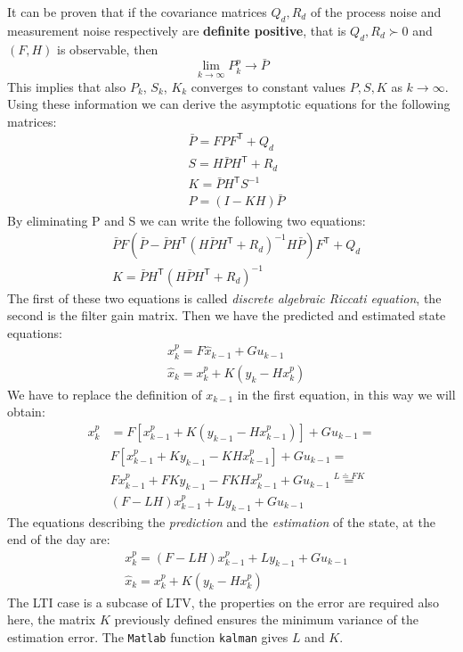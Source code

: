 It can be proven that if the covariance matrices $Q_d, R_d$ of the process noise and measurement noise respectively are \textbf{definite positive}, that is $Q_d, R_d \succ 0$ and $(F, H)$ is observable, then
\begin{equation*}
    \lim_{k\to\infty} P_k^p \to \bar{P}
\end{equation*}
This implies that also $P_k$, $S_k$, $K_k$ converges to constant values $P, S, K$ as $k\to\infty$. Using these information we can derive the asymptotic equations for the following matrices:
\begin{align*}
    &\bar{P} = FPF^{\textsf{T}} + Q_d \\
    &S = H\bar{P}H^{\textsf{T}}+ R_d \\
    &K = \bar{P}H^{\textsf{T}}S^{-1}\\
    &P = (I-KH) \bar{P}
\end{align*}
By eliminating P and S we can write the following two equations: 
\begin{align}
    &\bar{P}  F(\bar{P} - \bar{P}H^{\textsf{T}} (H\bar{P}H^{\textsf{T}}+R_d)^{-1} H \bar{P})F^{\textsf{T}} + Q_d\\
    &K = \bar{P}H^{\textsf{T}}(H\bar{P}H^{\textsf{T}}+R_d)^{-1}
\end{align}
The first of these two equations is called \textit{discrete algebraic Riccati equation}, the second is the filter gain matrix. Then we have the predicted and estimated state equations:
\begin{align*}
    &x_k^p = F \hat{x}_{k-1} + G u_{k-1}\\
    &\hat{x}_k = x_k^p + K (y_k-H x_k^p)
\end{align*}
We have to replace the definition of $x_{k-1}$ in the first equation, in this way we will obtain: 
\begin{align*}
    x_k^p &= F [x_{k-1}^p + K (y_{k-1} - H x_{k-1}^p)] + G u_{k-1} =\\
    & F[x_{k-1}^p + K y_{k-1} -KH x_{k-1}^p] + G u_{k-1}=\\
    & F x_{k-1}^p + FK y_{k-1} - FKH x_{k-1}^p + G u_{k-1}
    \overset{L \doteq FK }{=}\\
    & (F-LH) x_{k-1}^p + L y_{k-1} + G u_{k-1}
\end{align*}
The equations describing the \textit{prediction} and the \textit{estimation} of the state, at the end of the day are:
\begin{align}
    &x_k^p = (F-LH) x_{k-1}^p + L y_{k-1} + G u_{k-1}\\
    &\hat{x}_k = x_k^p + K (y_k-H x_k^p)
\end{align}
\noindent 
The LTI case is a subcase of LTV, the properties on the error are required also here, the matrix $K$ previously defined ensures the minimum variance of the estimation error. The \texttt{Matlab} function \texttt{kalman} gives $L$ and $K$.
 
